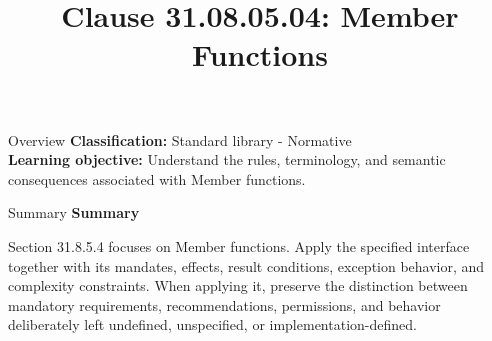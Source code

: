 \documentclass[10pt,letterpaper]{article}
\title{Clause 31.08.05.04: Member Functions}
\author{}
\date{}
\begin{document}
\maketitle
\begin{CornellOverviewBox}{Overview}
\textbf{Classification:} Standard library - Normative\\[2pt]
\textbf{Learning objective:} Understand the rules, terminology, and semantic consequences associated with Member functions.
\end{CornellOverviewBox}\begin{CornellSummaryBox}{Summary}
{\sffamily\bfseries\color{Accent} Summary}\par\vspace{3pt}Section 31.8.5.4 focuses on Member functions. Apply the specified interface together with its mandates, effects, result conditions, exception behavior, and complexity constraints. When applying it, preserve the distinction between mandatory requirements, recommendations, permissions, and behavior deliberately left undefined, unspecified, or implementation-defined.
\end{CornellSummaryBox}
\end{document}
